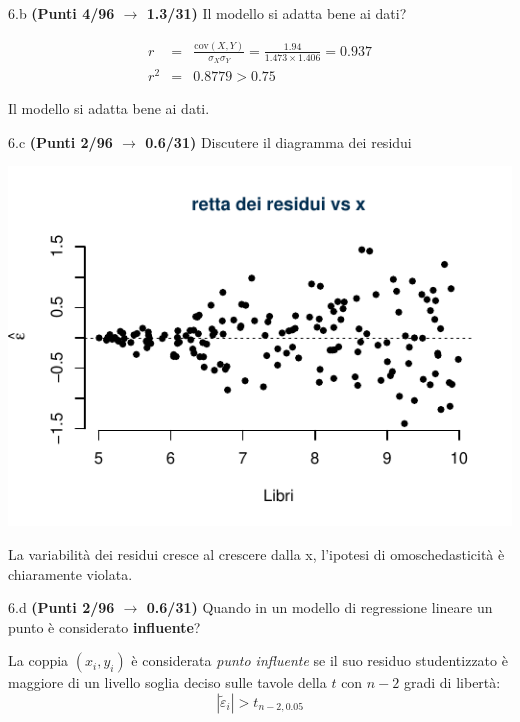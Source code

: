 \documentclass[
  11pt,
]{book}
\theoremstyle{mytheoremstyle}
\theoremstyle{mydefstyle}
\newenvironment{sol}
  {
  \begin{tcolorbox}[enhanced,breakable,arc=0.1mm,boxrule=1pt,colback=white,colframe=iblue,
  title=\bf \fontfamily{lmss}\selectfont \hspace{.5 cm} Soluzione,drop fuzzy shadow]

}{
\end{tcolorbox}
  }
\begin{document}
6.b \textbf{(Punti 4/96 \(\rightarrow\) 1.3/31)} Il modello si adatta bene ai dati?

\begin{sol}
\begin{eqnarray*}
r&=&\frac{\text{cov}(X,Y)}{\sigma_X\sigma_Y}=\frac{ 1.94 }{ 1.473 \times 1.406 }= 0.937 \\ 
r^2&=& 0.8779 > 0.75
\end{eqnarray*}

Il modello si adatta bene ai dati.

\end{sol}

6.c \textbf{(Punti 2/96 \(\rightarrow\) 0.6/31)} Discutere il diagramma dei residui

\begin{center}\includegraphics{Esami_passati_con_soluzioni_files/figure-latex/2021-53-1} \end{center}

\begin{sol}
La variabilità dei residui cresce al crescere dalla x, l'ipotesi di omoschedasticità è chiaramente violata.

\end{sol}

6.d \textbf{(Punti 2/96 \(\rightarrow\) 0.6/31)} Quando in un modello di regressione lineare un punto è considerato \textbf{influente}?

\begin{sol}
La coppia \((x_i,y_i)\) è considerata \emph{punto influente} se il suo residuo studentizzato è maggiore di un livello soglia deciso sulle tavole della \(t\) con \(n-2\) gradi di libertà:
\[|\tilde \varepsilon_i|>t_{n-2,0.05} \]

\end{sol}
\end{document}
